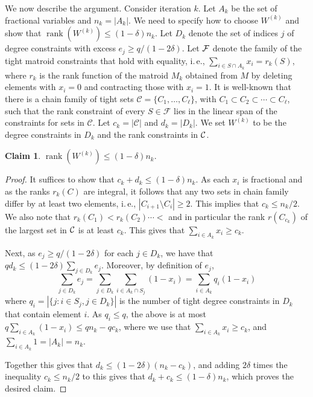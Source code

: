 \documentclass[11pt]{article}
\newcommand{\rank}{\operatorname{rank}}
\newtheorem{claim}[theorem]{Claim}
\theoremstyle{definition}
\newcommand{\ie}{i.\,e.}
\begin{document}
We now describe the argument. Consider iteration $k$. Let $A_k$ be the set of fractional variables and $n_k=|A_k|$. We need to specify how to choose $W^{(k)}$ and show that $\rank(W^{(k)}) \leq (1-\delta)n_k$.
Let $D_k$ denote the set of indices $j$ of degree constraints with excess $e_j \geq  q/(1-2\delta)$.
Let $\cal{F}$ denote the family of the tight matroid constraints that hold with equality, \ie, $\sum_{i \in S \cap A_k} x_i = r_k(S)$, where $r_k$ is the rank function of the matroid $M_k$ obtained from $M$ by deleting elements with $x_i=0$ and contracting those with $x_i=1$.
It is well-known \cite{schrijver-book-b} that there is a chain family of tight sets $\mathcal{C} = \{C_1,\ldots,C_{\ell}\}$, with  $C_1 \subset C_2 \subset \cdots \subset  C_{\ell}$,
such that the rank constraint of every $S \in \mathcal{F}$
lies in the linear span of the constraints for sets in $\mathcal{C}$.  Let $c_k = |\mathcal{C}|$ and $d_k=|D_k|$. We set $W^{(k)}$ to be the degree constraints in $D_k$ and the rank constraints in $\cal{C}$.

\begin{claim}
$\rank(W^{(k)}) \leq (1-\delta) n_k.$
\end{claim}
\begin{proof}
It suffices to show that $c_k + d_k \leq (1-\delta) n_k$.
As each $x_i$ is fractional and as the ranks $r_k(C)$ are integral, it follows that any two sets in chain family differ by at least two elements, \ie, $|C_{i+1}\setminus C_i | \geq 2$.
 This implies that  $c_k \leq n_k/2$.  We also note that $r_k(C_1) < r_k(C_2) \cdots <$ and in particular the rank $r(C_{c_k})$ of the largest set in $\cal{C}$ is at least $c_k$. This gives that $ \sum_{i \in A_k} x_i \geq c_k$.

 Next, as $e_j \geq q/(1-2\delta)$ for each $j \in D_k$, we have that $q d_k   \leq  (1-2 \delta)  \sum_{j \in D_k}  e_j$.
Moreover, by definition of $e_j$,
\[ \sum_{j \in D_k}  e_j  =   \sum_{j \in D_k} \sum_{i \in A_k \cap S_j}  (1-x_i)   = \sum_{i \in A_k}  q_i(1-x_i) \]
where  $q_i = |\{j: i\in S_j, j \in D_k \}|$ is the number of tight degree constraints in $D_k$ that contain element $i$.
As $q_i \leq q$, the above is at most $q \sum_{i \in A_k} (1-x_i)  \leq q n_k - q c_k$,
where we use that  $\sum_{i \in A_k} x_i \geq c_k$, and $\sum_{i \in A_k} 1 = |A_k|=n_k$.

Together this gives that $d_k \leq  (1-2\delta)  (n_k-c_k)$, and adding $2\delta$ times the inequality $c_k \leq n_k/2$  to this gives that $d_k +  c_k \leq  (1-\delta) n_k$, which proves the desired claim.
\end{proof}
\end{document}
